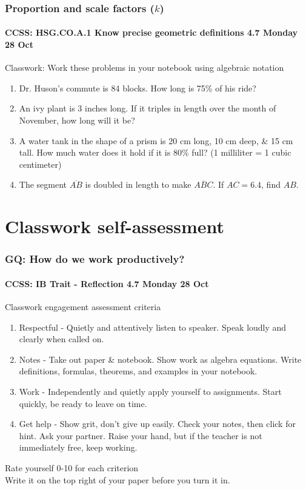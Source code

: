 \documentclass{beamer}
\begin{document}
\frame
{
  \frametitle{Proportion and scale factors ($k$)}
  \framesubtitle{CCSS: HSG.CO.A.1 Know precise geometric definitions \hfill \alert{4.7 Monday 28 Oct}}

  \begin{block}{Classwork: Work these problems in your notebook using algebraic notation}
  \begin{enumerate}
    \item Dr. Huson's commute is 84 blocks. How long is 75\% of his ride?
    \item An ivy plant is 3 inches long. If it triples in length over the month of November, how long will it be?
    \item A water tank in the shape of a prism is 20 cm long, 10 cm deep, \& 15 cm tall. How much water does it hold if it is 80\% full? (1 milliliter = 1 cubic centimeter)
    \item The segment $\overline{AB}$ is doubled in length to make $\overline{ABC}$. If $AC = 6.4$, find $AB$.
  \end{enumerate}
  \end{block}
}

\section{Classwork self-assessment}
\frame
{
\frametitle{GQ: How do we work productively?}
\framesubtitle{CCSS: IB Trait - Reflection \hfill \alert{4.7 Monday 28 Oct}}
\begin{block}{Classwork engagement assessment criteria}
  \begin{enumerate}
    \item Respectful - Quietly and attentively listen to speaker. Speak loudly and clearly when called on.
    \item Notes - Take out paper \& notebook. Show work as algebra equations. Write definitions, formulas, theorems, and examples in your notebook.
    \item Work - Independently and quietly apply yourself to assignments. Start quickly, be ready to leave on time.
    \item Get help - Show grit, don't give up easily. Check your notes, then click for hint. Ask your partner. Raise your hand, but if the teacher is not immediately free, keep working.
  \end{enumerate}
  \end{block}
  Rate yourself 0-10 for each criterion\\
  Write it on the top right of your paper before you turn it in.
  }
\end{document}
